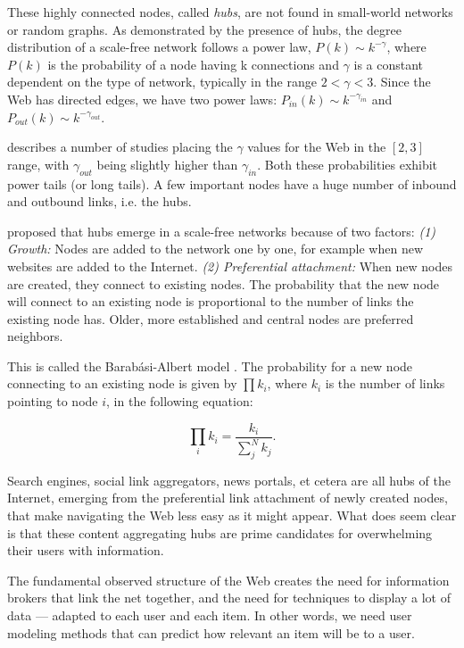 These highly connected nodes, called \emph{hubs}, are not found in small-world networks or random graphs. As demonstrated by the presence of hubs, the degree distribution of a scale-free network follows a power law, 
$P(k) \sim k^{-\gamma}$, 
where $P(k)$ is the probability of a node having k connections and $\gamma$ is a constant dependent on the type of network, typically in the range $2 < \gamma < 3$. 
Since the Web has directed edges,
we have two power laws:
$P_{in}(k) \sim k^{-\gamma_{in}}$ and 
$P_{out}(k) \sim k^{-\gamma_{out}}$.

\cite{Albert1999} describes a number of studies placing the $\gamma$ values for the Web in the $[2,3]$ range, 
with $\gamma_{out}$ being slightly higher than $\gamma_{in}$. 
Both these probabilities exhibit power tails (or long tails). 
A few important nodes have a huge number of inbound and outbound links, i.e. the hubs. 

\citet[p.86]{Barabasi2003} proposed that hubs emerge in a scale-free networks because of two factors:
\emph{(1) Growth:} Nodes are added to the network one by one, for example when new websites are added to the Internet.
\emph{(2) Preferential attachment:} When new nodes are created, they connect to existing nodes. The probability that the new node will connect to an existing node is proportional to the number of links the existing node has. Older, more established and central nodes are preferred neighbors.

This is called the Barab\'{a}si-Albert model \citep{Albert1999}. 
The probability for a new node connecting to an existing node is given by $\prod k_i$, 
where $k_i$ is the number of links pointing to node $i$, in the following equation: 

\begin{equation*}
  \prod_{i} k_i  = \frac{k_i}{\sum_{j}^N k_j}.
\end{equation*} 

Search engines, social link aggregators, news portals, et cetera are all hubs of the Internet, emerging from the preferential 
link attachment of newly created nodes, that make navigating the Web less easy as it might appear.
What does seem clear is that these content aggregating hubs are prime candidates for overwhelming their users with information. 

The fundamental observed structure of the Web creates the need for information brokers that link the net together, 
and the need for techniques to display a lot of data --- adapted to each user and each item.
In other words, we need user modeling methods that can predict how relevant an item will be to a user.


 


